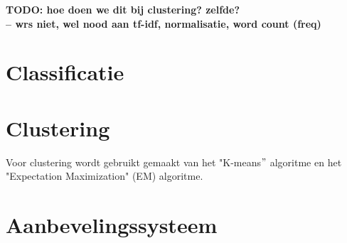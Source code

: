 \textbf{TODO: hoe doen we dit bij clustering? zelfde?\\-- wrs niet, wel nood aan tf-idf, normalisatie, word count (freq)}

\section{Classificatie}\label{result-clas}




\section{Clustering}
Voor clustering wordt gebruikt gemaakt van het "K-means$"$ algoritme en het "Expectation Maximization" (EM) algoritme. 

\section{Aanbevelingssysteem}